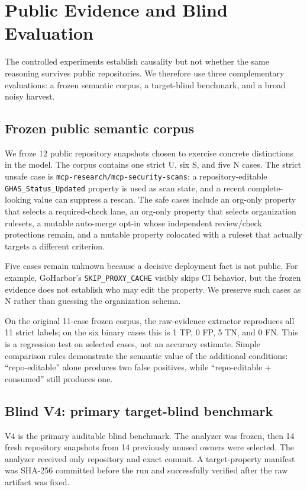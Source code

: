 \documentclass[sigconf,review,anonymous]{acmart}
\newcommand{\U}{\textsf{U}}
\newcommand{\Ssafe}{\textsf{S}}
\newcommand{\N}{\textsf{N}}
\begin{document}
\section{Public Evidence and Blind Evaluation}

The controlled experiments establish causality but not whether the same
reasoning survives public repositories.  We therefore use three complementary
evaluations: a frozen semantic corpus, a target-blind benchmark, and a broad
noisy harvest.

\subsection{Frozen public semantic corpus}

We froze 12 public repository snapshots chosen to exercise concrete distinctions
in the model.  The corpus contains one strict \U{}, six \Ssafe{}, and five \N{}
cases.  The strict unsafe case is
\nolinkurl{mcp-research/mcp-security-scans}: a repository-editable
\texttt{GHAS\_Status\_Updated} property is used as scan state, and a recent
complete-looking value can suppress a rescan.  The safe cases include an
org-only property that selects a required-check lane, an org-only property that
selects organization rulesets, a mutable auto-merge opt-in whose independent
review/check protections remain, and a mutable property colocated with a
ruleset that actually targets a different criterion.

Five cases remain unknown because a decisive deployment fact is not public.  For
example, GoHarbor's \texttt{SKIP\_PROXY\_CACHE} visibly skips CI behavior, but
the frozen evidence does not establish who may edit the property.  We preserve
such cases as \N{} rather than guessing the organization schema.

On the original 11-case frozen corpus, the raw-evidence extractor reproduces all
11 strict labels; on the six binary cases this is 1 TP, 0 FP, 5 TN, and 0 FN.
This is a regression test on selected cases, not an accuracy estimate.  Simple
comparison rules demonstrate the semantic value of the additional conditions:
``repo-editable'' alone produces two false positives, while
``repo-editable + consumed'' still produces one.

\subsection{Blind V4: primary target-blind benchmark}
\label{sec:v4}

V4 is the primary auditable blind benchmark.  The analyzer was frozen, then 14
fresh repository snapshots from 14 previously unused owners were selected.  The
analyzer received only repository and exact commit.  A target-property manifest
was SHA-256 committed before the run and successfully verified after the raw
artifact was fixed.
\end{document}
